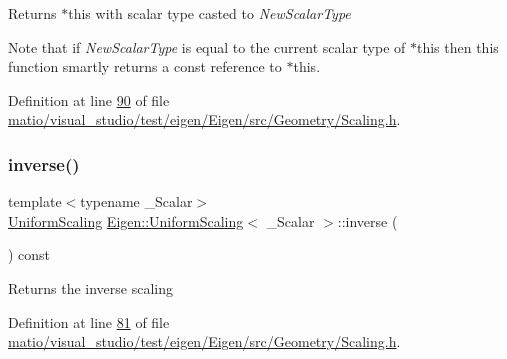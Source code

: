 \begin{DoxyReturn}{Returns}
{\ttfamily $\ast$this} with scalar type casted to {\itshape New\+Scalar\+Type} 
\end{DoxyReturn}
Note that if {\itshape New\+Scalar\+Type} is equal to the current scalar type of {\ttfamily $\ast$this} then this function smartly returns a const reference to {\ttfamily $\ast$this}. 

Definition at line \hyperlink{matio_2visual__studio_2test_2eigen_2_eigen_2src_2_geometry_2_scaling_8h_source_l00090}{90} of file \hyperlink{matio_2visual__studio_2test_2eigen_2_eigen_2src_2_geometry_2_scaling_8h_source}{matio/visual\+\_\+studio/test/eigen/\+Eigen/src/\+Geometry/\+Scaling.\+h}.

\mbox{\label{class_eigen_1_1_uniform_scaling_a60dba22bebe9e2c97cfbc76f85eb1b78}} 
\subsubsection{\texorpdfstring{inverse()}{inverse()}\hspace{0.1cm}{\footnotesize\ttfamily [1/2]}}
{\footnotesize\ttfamily template$<$typename \+\_\+\+Scalar$>$ \\
\hyperlink{class_eigen_1_1_uniform_scaling}{Uniform\+Scaling} \hyperlink{class_eigen_1_1_uniform_scaling}{Eigen\+::\+Uniform\+Scaling}$<$ \+\_\+\+Scalar $>$\+::inverse (\begin{DoxyParamCaption}{ }\end{DoxyParamCaption}) const\hspace{0.3cm}{\ttfamily [inline]}}

\begin{DoxyReturn}{Returns}
the inverse scaling 
\end{DoxyReturn}


Definition at line \hyperlink{matio_2visual__studio_2test_2eigen_2_eigen_2src_2_geometry_2_scaling_8h_source_l00081}{81} of file \hyperlink{matio_2visual__studio_2test_2eigen_2_eigen_2src_2_geometry_2_scaling_8h_source}{matio/visual\+\_\+studio/test/eigen/\+Eigen/src/\+Geometry/\+Scaling.\+h}.

\mbox{\label{class_eigen_1_1_uniform_scaling_a60dba22bebe9e2c97cfbc76f85eb1b78}} 
